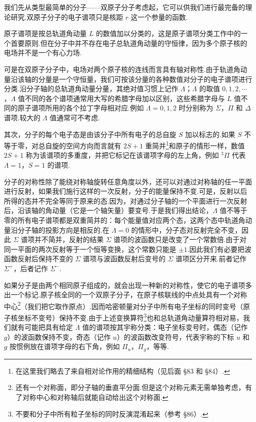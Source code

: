 我们先从类型最简单的分子——双原子分子考虑起，它可以供我们进行最完备的理论研究.双原子分子的电子谱项只是核距 $r$ 这一个参量的函数.

原子谱项是按总轨道角动量 $L$ 的数值加以分类的，这是原子谱项分类工作中的一个首要原则.但在分子中并不存在电子总轨道角动量的守恒律，因为多个原子核的电场并不是一个有心力场.

可是在双原子分子中，电场对两个原子核的连线而言具有轴对称性.由于轨道角动量沿该轴的分量是一个守恒量，我们可按该分量的各种数值对分子的电子谱项进行分类.沿分子轴的总轨道角动量分量，其绝对值习惯上记作 $\Lambda$；$\Lambda$ 的取值 $0,1,2,\cdots$，$\Lambda$ 值不同的各个谱项通常用大写的希腊字母加以区别，这些希腊字母与 $L$ 值不同的原子谱项所用的各个拉丁字母相对应.例如 $\Lambda=0,1,2$ 时分别称为 $\Sigma$，$\Pi$ 和 $\Delta$ 谱项.较大的 $\Lambda$ 值通常可不考虑.

其次，分子的每个电子态是由该分子中所有电子的总自旋 $S$ 加以标志的.如果 $S$ 不等于零，对总自旋的空间方向而言就有 $2S+1$ 重简并\footnote{在这里我们略去了来自相对论作用的精细结构（见后面 §83 和 §84）.}和原子的情形一样，数值 $2S+1$ 称为该谱项的多重度，并把它标记在该谱项字母的左上角，例如 $^3\Pi$ 代表 $\Lambda=1$，$S=1$ 的谱项.

分子的对称性除了能绕对称轴旋转任意角度以外，还可以对通过对称轴的任一平面进行反射，如果我们施行这样的一次反射，分子的能量保持不变.可是，反射以后所得的态并不完全等同于原来的态.因为，对通过分子轴的一个平面进行一次反射后，沿该轴的角动量（它是一个轴矢量）要变号.于是我们得出结论，$\Lambda$ 值不等于零的所有电子谱项都是双重简并的：每个能量值对应两个态，这两个态中轨道角动量沿分子轴的投影方向是相反的.在 $\Lambda=0$ 的情形中，分子态对反射完全不变，因此 $\Sigma$ 谱项并不简并，反射的结果 $\Sigma$ 谱项的波函数只是改变了一个常数倍.由于对同一平面的两次反射等于一个恒等变换，这个常数只能是 $\pm1$.因此我们有必要把波函数反射后保持不变的 $\Sigma$ 谱项与波函数反射后变号的 $\Sigma$ 谱项区分开来.前者记作 $\Sigma^+$，后者记作 $\Sigma^-$.

如果分子是由两个相同原子组成的，就会出现一种新的对称性，使它的电子谱项多出一个标记.原子核全同的一个双原子分子，在原子核联线的中点处具有一个对称中心\footnote{还有一个对称面，即分子轴的垂直平分面.但是这个对称元素无需单独考虑，有了对称中心和对称轴后就能自动给出这个对称面.}（我们把它取作原点）.因而哈密顿量对分子中所有电子坐标的同时变号（原子核坐标不变号）保持不变.由于上述变换算符\footnote{不要和分子中所有粒子坐标的同时反演混淆起来（参考 §86）.}也和总轨道角动量算符相对易，我们就有可能把具有给定 $\Lambda$ 值的谱项按其宇称分类：电子坐标变号时，偶态（记作 $g$）的波函数保持不变，奇态（记作 $u$）的波函数改变符号，代表宇称的下标 $u$ 和 $g$ 按惯例放在谱项字母的右下角，例如 $\Pi_u$，$\Pi_g$，等等.

